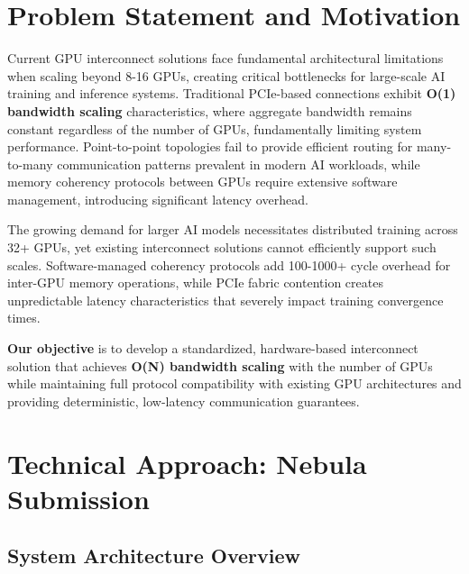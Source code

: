 \documentclass[11pt,a4paper]{article}
\begin{document}
\section{Problem Statement and Motivation}

Current GPU interconnect solutions face fundamental architectural limitations when scaling beyond 8-16 GPUs, creating critical bottlenecks for large-scale AI training and inference systems. Traditional PCIe-based connections exhibit \textbf{O(1) bandwidth scaling} characteristics, where aggregate bandwidth remains constant regardless of the number of GPUs, fundamentally limiting system performance. Point-to-point topologies fail to provide efficient routing for many-to-many communication patterns prevalent in modern AI workloads, while memory coherency protocols between GPUs require extensive software management, introducing significant latency overhead.

The growing demand for larger AI models necessitates distributed training across 32+ GPUs, yet existing interconnect solutions cannot efficiently support such scales. Software-managed coherency protocols add 100-1000+ cycle overhead for inter-GPU memory operations, while PCIe fabric contention creates unpredictable latency characteristics that severely impact training convergence times.

\textbf{Our objective} is to develop a standardized, hardware-based interconnect solution that achieves \textbf{O(N) bandwidth scaling} with the number of GPUs while maintaining full protocol compatibility with existing GPU architectures and providing deterministic, low-latency communication guarantees.

\section{Technical Approach: Nebula Submission}

\subsection{System Architecture Overview}
\end{document}
